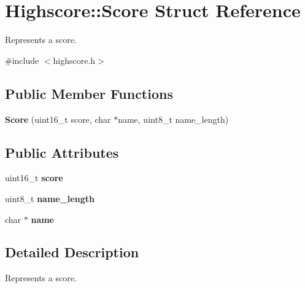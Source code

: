 \hypertarget{struct_highscore_1_1_score}{}\section{Highscore\+:\+:Score Struct Reference}
\label{struct_highscore_1_1_score}


Represents a score.  




{\ttfamily \#include $<$highscore.\+h$>$}

\subsection*{Public Member Functions}
\begin{DoxyCompactItemize}
\item 
{\bfseries Score} (uint16\+\_\+t score, char $\ast$name, uint8\+\_\+t name\+\_\+length)\hypertarget{struct_highscore_1_1_score_a12b53d0585857767f7b672a7ca6d6bcd}{}\label{struct_highscore_1_1_score_a12b53d0585857767f7b672a7ca6d6bcd}

\end{DoxyCompactItemize}
\subsection*{Public Attributes}
\begin{DoxyCompactItemize}
\item 
uint16\+\_\+t {\bfseries score}\hypertarget{struct_highscore_1_1_score_adb7302dea6fad5c7420f7df730829df6}{}\label{struct_highscore_1_1_score_adb7302dea6fad5c7420f7df730829df6}

\item 
uint8\+\_\+t {\bfseries name\+\_\+length}\hypertarget{struct_highscore_1_1_score_a078c44b0290200e5f94d80bf2d21fec1}{}\label{struct_highscore_1_1_score_a078c44b0290200e5f94d80bf2d21fec1}

\item 
char $\ast$ {\bfseries name}\hypertarget{struct_highscore_1_1_score_aee466300716e218f0ebb6c695a7e52ca}{}\label{struct_highscore_1_1_score_aee466300716e218f0ebb6c695a7e52ca}

\end{DoxyCompactItemize}


\subsection{Detailed Description}
Represents a score. 


